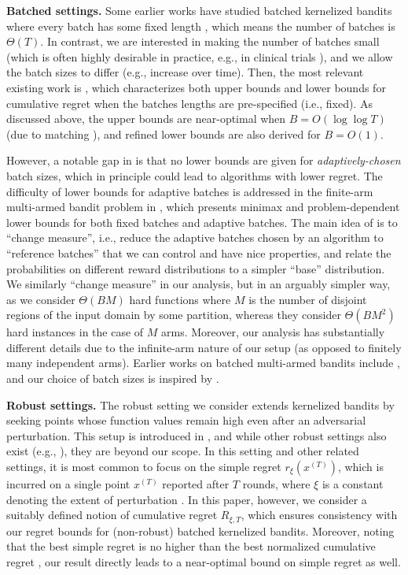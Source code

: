 \documentclass[10pt]{article}
\begin{document}
\textbf{Batched settings.} 
Some earlier works have studied batched kernelized bandits where every batch has some fixed length \citep{Contal13, Desautels14, Kandasamy18}, which means the number of batches is $\Theta(T)$. In contrast, we are interested in making the number of batches small (which is often highly desirable in practice, e.g., in clinical trials \citep{Gao19}), and we allow the batch sizes to differ (e.g., increase over time).
Then, the most relevant existing work is \citep{Li22}, which characterizes both upper bounds and lower bounds for cumulative regret when the batches lengths are pre-specified (i.e., fixed). As discussed above, the upper bounds are near-optimal when $B = O(\log \log T)$ (due to matching \citep{Scarlett17}), and refined lower bounds are also derived for $B = O(1)$.

However, a notable gap in \citep{Li22} is that no lower bounds are given for \emph{adaptively-chosen} batch sizes, which in principle could lead to algorithms with lower regret.  The difficulty of lower bounds for adaptive batches is addressed in the finite-arm multi-armed bandit problem in \citep{Gao19}, which presents minimax and problem-dependent lower bounds for both fixed batches and adaptive batches. The main idea of \citep{Gao19} is to ``change measure'', i.e., reduce the adaptive batches chosen by an algorithm to ``reference batches'' that we can control and have nice properties, and relate the probabilities on different reward distributions to a simpler ``base'' distribution. We similarly ``change measure'' in our analysis, but in an arguably simpler way, as we consider $\Theta(BM)$ hard functions where $M$ is the number of disjoint regions of the input domain by some partition, whereas they consider $\Theta(BM^2)$ hard instances in the case of $M$ arms.
Moreover, our analysis has substantially different details due to the infinite-arm nature of our setup (as opposed to finitely many independent arms).
Earlier works on batched multi-armed bandits include \citep{Cesa-Bianchi13, Perchet16, Esfandiari21}, and our choice of batch sizes is inspired by \citep{Cesa-Bianchi13}.

\textbf{Robust settings.} The robust setting we consider extends kernelized bandits by seeking points whose function values remain high even after an adversarial perturbation. This setup is introduced in \citep{Bogunovic18}, and while other robust settings also exist (e.g., \citep{Bogunovic20}), they are beyond our scope. 
In this setting and other related settings, it is most common to focus on the simple regret $r_{\xi}(x^{(T)})$, which is incurred on a single point $x^{(T)}$ reported after $T$ rounds, where $\xi$ is a constant denoting the extent of perturbation \citep{Bogunovic18, Sessa20, Nguyen20}.
In this paper, however, we consider a suitably defined notion of cumulative regret $R_{\xi, T}$, which ensures consistency with our regret bounds for (non-robust) batched kernelized bandits. Moreover, noting that the best simple regret is no higher than the best normalized cumulative regret \citep{Bubeck09}, our result directly leads to a near-optimal bound on simple regret as well.
\end{document}
